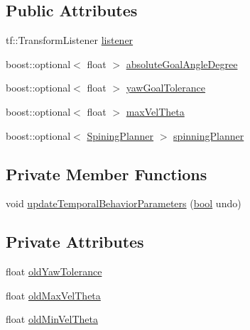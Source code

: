 \subsection*{Public Attributes}
\begin{DoxyCompactItemize}
\item 
tf\+::\+Transform\+Listener \hyperlink{classcl__move__base__z_1_1CbAbsoluteRotate_ad946bb6486dc35baf03ec1cc430a3406}{listener}
\item 
boost\+::optional$<$ float $>$ \hyperlink{classcl__move__base__z_1_1CbAbsoluteRotate_ad5d0e21549940444e1cb525cda73329a}{absolute\+Goal\+Angle\+Degree}
\item 
boost\+::optional$<$ float $>$ \hyperlink{classcl__move__base__z_1_1CbAbsoluteRotate_a8d8b5b9c2c821efe101bb07c96c4bdd3}{yaw\+Goal\+Tolerance}
\item 
boost\+::optional$<$ float $>$ \hyperlink{classcl__move__base__z_1_1CbAbsoluteRotate_ac0018b01a202dd805e3d3b50ed205d23}{max\+Vel\+Theta}
\item 
boost\+::optional$<$ \hyperlink{namespacecl__move__base__z_aab2ad3041275145f0065fb60b3299345}{Spining\+Planner} $>$ \hyperlink{classcl__move__base__z_1_1CbAbsoluteRotate_a17d836524599af072cf2e3488e491a91}{spinning\+Planner}
\end{DoxyCompactItemize}
\subsection*{Private Member Functions}
\begin{DoxyCompactItemize}
\item 
void \hyperlink{classcl__move__base__z_1_1CbAbsoluteRotate_a2d8a4200dcacc00ad60c22ad2af5d4b2}{update\+Temporal\+Behavior\+Parameters} (\hyperlink{classbool}{bool} undo)
\end{DoxyCompactItemize}
\subsection*{Private Attributes}
\begin{DoxyCompactItemize}
\item 
float \hyperlink{classcl__move__base__z_1_1CbAbsoluteRotate_a2cfcd2978e7923494e2e66107e134e27}{old\+Yaw\+Tolerance}
\item 
float \hyperlink{classcl__move__base__z_1_1CbAbsoluteRotate_a131095d57ad3fd423bb9eaebebf61cc9}{old\+Max\+Vel\+Theta}
\item 
float \hyperlink{classcl__move__base__z_1_1CbAbsoluteRotate_a280721d1887e622330ee3ac44b7e84d5}{old\+Min\+Vel\+Theta}
\end{DoxyCompactItemize}
